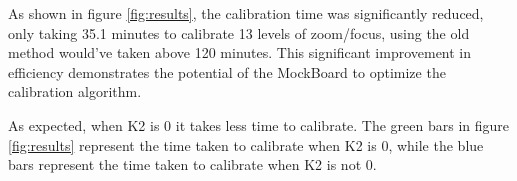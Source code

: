 \noindent As shown in figure \ref{fig:results}, the calibration time was significantly reduced, only taking 35.1 minutes to calibrate 13 levels of zoom/focus, 
using the old method would've taken above 120 minutes. This significant improvement in efficiency demonstrates the potential 
of the MockBoard to optimize the calibration algorithm.

\noindent As expected, when K2 is 0 it takes less time to calibrate. The green bars in figure \ref{fig:results} represent the time taken to calibrate when K2 is 0, while the blue bars represent the 
time taken to calibrate when K2 is not 0.